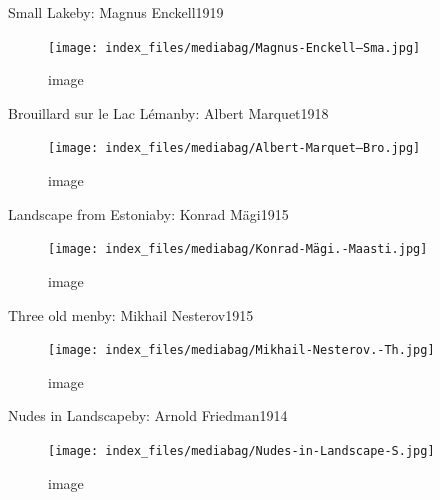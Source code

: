 \documentclass[
  a4paper,
]{book}
\begin{document}
\label{http:ux2fux2fwww.wikidata.orgux2fentityux2fQ20795141}
Small Lakeby: Magnus Enckell1919

\begin{figure}[H]

{\centering \texttt{[image: index\_files/mediabag/Magnus-Enckell---Sma.jpg]}

}

\caption{image}

\end{figure}%

\label{http:ux2fux2fwww.wikidata.orgux2fentityux2fQ26940419}
Brouillard sur le Lac Lémanby: Albert Marquet1918

\begin{figure}[H]

{\centering \texttt{[image: index\_files/mediabag/Albert-Marquet---Bro.jpg]}

}

\caption{image}

\end{figure}%

\label{http:ux2fux2fwww.wikidata.orgux2fentityux2fQ50353962}
Landscape from Estoniaby: Konrad Mägi1915

\begin{figure}[H]

{\centering \texttt{[image: index\_files/mediabag/Konrad-Mägi.-Maasti.jpg]}

}

\caption{image}

\end{figure}%

\label{http:ux2fux2fwww.wikidata.orgux2fentityux2fQ105078801}
Three old menby: Mikhail Nesterov1915

\begin{figure}[H]

{\centering \texttt{[image: index\_files/mediabag/Mikhail-Nesterov.-Th.jpg]}

}

\caption{image}

\end{figure}%

\label{http:ux2fux2fwww.wikidata.orgux2fentityux2fQ20488491}
Nudes in Landscapeby: Arnold Friedman1914

\begin{figure}[H]

{\centering \texttt{[image: index\_files/mediabag/Nudes-in-Landscape-S.jpg]}

}

\caption{image}

\end{figure}%
\end{document}
